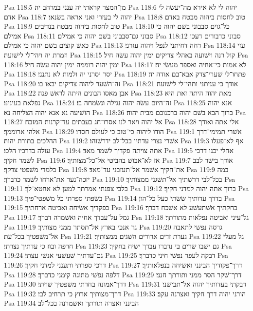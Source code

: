 Psa 118:5  מן־המצר קראתי יה ענני במרחב יה׃
Psa 118:6  יהוה לי לא אירא מה־יעשׂה לי אדם׃
Psa 118:7  יהוה לי בעזרי ואני אראה בשׂנאי׃
Psa 118:8  טוב לחסות ביהוה מבטח באדם׃
Psa 118:9  טוב לחסות ביהוה מבטח בנדיבים׃
Psa 118:10  כל־גוים סבבוני בשׁם יהוה כי אמילם׃
Psa 118:11  סבוני גם־סבבוני בשׁם יהוה כי אמילם׃
Psa 118:12  סבוני כדבורים דעכו כאשׁ קוצים בשׁם יהוה כי אמילם׃
Psa 118:13  דחה דחיתני לנפל ויהוה עזרני׃
Psa 118:14  עזי וזמרת יה ויהי־לי לישׁועה׃
Psa 118:15  קול רנה וישׁועה באהלי צדיקים ימין יהוה עשׂה חיל׃
Psa 118:16  ימין יהוה רוממה ימין יהוה עשׂה חיל׃
Psa 118:17  לא אמות כי־אחיה ואספר מעשׂי יה׃
Psa 118:18  יסר יסרני יה ולמות לא נתנני׃
Psa 118:19  פתחו־לי שׁערי־צדק אבא־בם אודה יה׃
Psa 118:20  זה־השׁער ליהוה צדיקים יבאו בו׃
Psa 118:21  אודך כי עניתני ותהי־לי לישׁועה׃
Psa 118:22  אבן מאסו הבונים היתה לראשׁ פנה׃
Psa 118:23  מאת יהוה היתה זאת היא נפלאת בעינינו׃
Psa 118:24  זה־היום עשׂה יהוה נגילה ונשׂמחה בו׃
Psa 118:25  אנא יהוה הושׁיעה נא אנא יהוה הצליחה נא׃
Psa 118:26  ברוך הבא בשׁם יהוה ברכנוכם מבית יהוה׃
Psa 118:27  אל יהוה ויאר לנו אסרו־חג בעבתים עד־קרנות המזבח׃
Psa 118:28  אלי אתה ואודך אלהי ארוממך׃
Psa 118:29  הודו ליהוה כי־טוב כי לעולם חסדו׃
Psa 119:1  אשׁרי תמימי־דרך ההלכים בתורת יהוה׃
Psa 119:2  אשׁרי נצרי עדתיו בכל־לב ידרשׁוהו׃
Psa 119:3  אף לא־פעלו עולה בדרכיו הלכו׃
Psa 119:4  אתה צויתה פקדיך לשׁמר מאד׃
Psa 119:5  אחלי יכנו דרכי לשׁמר חקיך׃
Psa 119:6  אז לא־אבושׁ בהביטי אל־כל־מצותיך׃
Psa 119:7  אודך בישׁר לבב בלמדי משׁפטי צדקך׃
Psa 119:8  את־חקיך אשׁמר אל־תעזבני עד־מאד׃
Psa 119:9  במה יזכה־נער את־ארחו לשׁמר כדברך׃
Psa 119:10  בכל־לבי דרשׁתיך אל־תשׁגני ממצותיך׃
Psa 119:11  בלבי צפנתי אמרתך למען לא אחטא־לך׃
Psa 119:12  ברוך אתה יהוה למדני חקיך׃
Psa 119:13  בשׂפתי ספרתי כל משׁפטי־פיך׃
Psa 119:14  בדרך עדותיך שׂשׂתי כעל כל־הון׃
Psa 119:15  בפקדיך אשׂיחה ואביטה ארחתיך׃
Psa 119:16  בחקתיך אשׁתעשׁע לא אשׁכח דברך׃
Psa 119:17  גמל על־עבדך אחיה ואשׁמרה דברך׃
Psa 119:18  גל־עיני ואביטה נפלאות מתורתך׃
Psa 119:19  גר אנכי בארץ אל־תסתר ממני מצותיך׃
Psa 119:20  גרסה נפשׁי לתאבה אל־משׁפטיך בכל־עת׃
Psa 119:21  גערת זדים ארורים השׁגים ממצותיך׃
Psa 119:22  גל מעלי חרפה ובוז כי עדתיך נצרתי׃
Psa 119:23  גם ישׁבו שׂרים בי נדברו עבדך ישׂיח בחקיך׃
Psa 119:24  גם־עדתיך שׁעשׁעי אנשׁי עצתי׃
Psa 119:25  דבקה לעפר נפשׁי חיני כדברך׃
Psa 119:26  דרכי ספרתי ותענני למדני חקיך׃
Psa 119:27  דרך־פקודיך הבינני ואשׂיחה בנפלאותיך׃
Psa 119:28  דלפה נפשׁי מתוגה קימני כדברך׃
Psa 119:29  דרך־שׁקר הסר ממני ותורתך חנני׃
Psa 119:30  דרך־אמונה בחרתי משׁפטיך שׁויתי׃
Psa 119:31  דבקתי בעדותיך יהוה אל־תבישׁני׃
Psa 119:32  דרך־מצותיך ארוץ כי תרחיב לבי׃
Psa 119:33  הורני יהוה דרך חקיך ואצרנה עקב׃
Psa 119:34  הבינני ואצרה תורתך ואשׁמרנה בכל־לב׃
